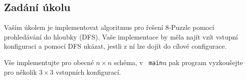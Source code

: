 \documentclass{article}
\begin{document}
	\subsection*{Zadání úkolu}
	
	Vaším úkolem je implementovat algoritmus pro řešení 8-Puzzle pomocí prohledávání do hloubky (DFS).
	Vaše implementace by měla najít vzít vstupní konfiguraci a pomocí DFS ukázat, jestli z ní lze dojít do cílové configurace.
	
	Vše implementujte pro obecné $n\times n$ schéma, v \verb| main|u pak program vyzkoušejte pro několik $3\times 3$ vstupních konfigurací.
\end{document}
